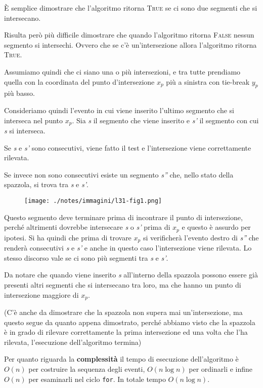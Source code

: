 È semplice dimostrare che l'algoritmo ritorna \textsc{True} se ci sono due segmenti che si intersecano.

Risulta però più difficile dimostrare che quando l'algoritmo ritorna \textsc{False} nessun segmento si intersechi. 
Ovvero che se c'è un'intersezione allora l'algoritmo ritorna \textsc{True}.

Assumiamo quindi che ci siano una o più intersezioni, e tra tutte prendiamo quella con la coordinata del punto d'intersezione $x_p$ più a sinistra con tie-break $y_p$ più basso.

Consideriamo quindi l'evento in cui viene inserito l'ultimo segmento che si interseca nel punto $x_p$. 
Sia \emph{s} il segmento che viene inserito e \emph{s'} il segmento con cui \emph{s} si interseca. 

Se \emph{s} e \emph{s'} sono consecutivi, viene fatto il test e l'intersezione viene correttamente rilevata. 

Se invece non sono consecutivi esiste un segmento \emph{s''} che, nello stato della spazzola, si trova tra \emph{s} e \emph{s'}. 

\begin{figure}[htbp]
	\centering
	\texttt{[image: ./notes/immagini/l31-fig1.png]}
\end{figure}

Questo segmento deve terminare prima di incontrare il punto di intersezione, perché altrimenti dovrebbe intersecare \emph{s} o \emph{s'} prima di $x_p$ e questo è assurdo per ipotesi. 
Si ha quindi che prima di trovare $x_p$ si verificherà l'evento destro di \emph{s''} che renderà consecutivi \emph{s} e \emph{s'} e anche in questo caso l'intersezione viene rilevata. 
Lo stesso discorso vale se ci sono più segmenti tra \emph{s} e \emph{s'}.

Da notare che quando viene inserito \emph{s} all'interno della spazzola possono essere già presenti altri segmenti che si intersecano tra loro, ma che hanno un punto di intersezione maggiore di $x_p$.

(C'è anche da dimostrare che la spazzola non supera mai un'intersezione, ma questo segue da quanto appena dimostrato, perché abbiamo visto che la spazzola è in grado di rilevare correttamente la prima intersezione ed una volta che l'ha rilevata, l'esecuzione dell'algoritmo termina)

Per quanto riguarda la \textbf{complessità} il tempo di esecuzione dell'algoritmo è $O(n)$ per costruire la sequenza degli eventi, $O(n \log n)$ per ordinarli e infine $O(n)$ per esaminarli nel ciclo \texttt{for}. 
In totale tempo $O(n \log n)$.

